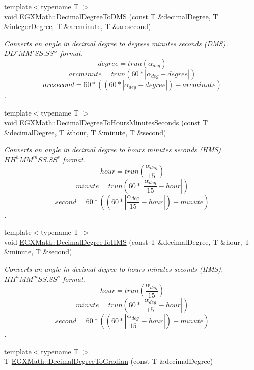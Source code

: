 \begin{DoxyCompactItemize}
{\footnotesize template$<$typename T $>$ }\\void \mbox{\hyperlink{group___e_g_x_math-_angle_conversions-_decimal_degree_ga64a1b298ce16e9edf3209b678a7bed46}{E\+G\+X\+Math\+::\+Decimal\+Degree\+To\+D\+MS}} (const T \&decimal\+Degree, T \&integer\+Degree, T \&arcminute, T \&arcsecond)
\begin{DoxyCompactList}\small\item\em Converts an angle in decimal degree to degrees minutes seconds (D\+MS). ${DD}^{\circ}{MM}'{SS.SS}''$ format. \[degree=trun(\alpha_{deg})\] \[arcminute=trun(60 * |\alpha_{deg} - degree|)\] \[arcsecond=60 * ((60 * |\alpha_{deg} - degree|)-arcminute)\]. \end{DoxyCompactList}\item 
{\footnotesize template$<$typename T $>$ }\\void \mbox{\hyperlink{group___e_g_x_math-_angle_conversions-_decimal_degree_gaa3f0b6c7c497882935487ad2d55a0f5a}{E\+G\+X\+Math\+::\+Decimal\+Degree\+To\+Hours\+Minutes\+Seconds}} (const T \&decimal\+Degree, T \&hour, T \&minute, T \&second)
\begin{DoxyCompactList}\small\item\em Converts an angle in decimal degree to hours minutes seconds (H\+MS). ${HH}^{h}{MM}^{m}{SS.SS}^{s}$ format. \[hour=trun(\frac{\alpha_{deg}}{15})\] \[minute=trun(60 * |\frac{\alpha_{deg}}{15} - hour|)\] \[second=60 * ((60 * |\frac{\alpha_{deg}}{15} - hour|)-minute)\]. \end{DoxyCompactList}\item 
{\footnotesize template$<$typename T $>$ }\\void \mbox{\hyperlink{group___e_g_x_math-_angle_conversions-_decimal_degree_ga981b48f16766590641360ca98dfa7b8c}{E\+G\+X\+Math\+::\+Decimal\+Degree\+To\+H\+MS}} (const T \&decimal\+Degree, T \&hour, T \&minute, T \&second)
\begin{DoxyCompactList}\small\item\em Converts an angle in decimal degree to hours minutes seconds (H\+MS). ${HH}^{h}{MM}^{m}{SS.SS}^{s}$ format. \[hour=trun(\frac{\alpha_{deg}}{15})\] \[minute=trun(60 * |\frac{\alpha_{deg}}{15} - hour|)\] \[second=60 * ((60 * |\frac{\alpha_{deg}}{15} - hour|)-minute)\]. \end{DoxyCompactList}\item 
{\footnotesize template$<$typename T $>$ }\\T \mbox{\hyperlink{group___e_g_x_math-_angle_conversions-_decimal_degree_ga3ac6f1ceb36a4938cdf3b55554734c99}{E\+G\+X\+Math\+::\+Decimal\+Degree\+To\+Gradian}} (const T \&decimal\+Degree)

\end{DoxyCompactItemize}
